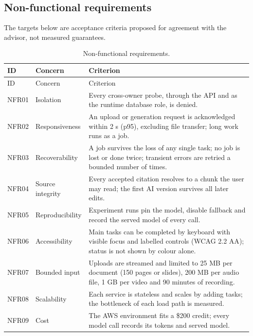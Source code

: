 \subsection{Non-functional requirements}
The targets below are acceptance criteria proposed for agreement with the advisor, not measured guarantees.
\begin{longtable}{|p{1.5cm}|p{3.0cm}|p{10.2cm}|}\caption{Non-functional requirements.}\label{tab:nfr}\\\hline
ID & Concern & Criterion\\\hline\endfirsthead
\hline ID & Concern & Criterion\\\hline\endhead
NFR01 & Isolation & Every cross-owner probe, through the API and as the runtime database role, is denied.\\\hline
NFR02 & Responsiveness & An upload or generation request is acknowledged within 2 s (p95), excluding file transfer; long work runs as a job.\\\hline
NFR03 & Recoverability & A job survives the loss of any single task; no job is lost or done twice; transient errors are retried a bounded number of times.\\\hline
NFR04 & Source integrity & Every accepted citation resolves to a chunk the user may read; the first AI version survives all later edits.\\\hline
NFR05 & Reproducibility & Experiment runs pin the model, disable fallback and record the served model of every call.\\\hline
NFR06 & Accessibility & Main tasks can be completed by keyboard with visible focus and labelled controls (WCAG 2.2 AA\citep{wcag}); status is not shown by colour alone.\\\hline
NFR07 & Bounded input & Uploads are streamed and limited to 25 MB per document (150 pages or slides), 200 MB per audio file, 1 GB per video and 90 minutes of recording.\\\hline
NFR08 & Scalability & Each service is stateless and scales by adding tasks; the bottleneck of each load path is measured.\\\hline
NFR09 & Cost & The AWS environment fits a \$200 credit; every model call records its tokens and served model.\\\hline
\end{longtable}
